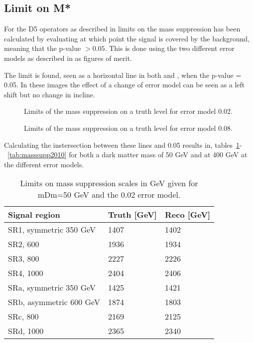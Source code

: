 \subsection{Limit on M*}\label{sec:res:subsec:m*}
For the D5 operators as described in  limits on the mass suppression has been calculated by evaluating at which point the signal is covered by the background, meaning that the p-value $>0.05$. This is done using the two different error models as described in  as figures of merit.

The limit is found, seen as a horizontal line in both  and , when the p-value = 0.05. In these images the effect of a change of error model can be seen as a left shift but no change in incline.

 \begin{figure}[H] %
    \hfill
    \caption{Limits of the mass suppression on a truth level for error model 0.02.}
    \label{fig:SRnewMt}
  \end{figure}

 \begin{figure}[H] %
    \hfill
    \caption{Limits of the mass suppression on a truth level for error model 0.08.}
    \label{fig:SRnewMr}
  \end{figure}

Calculating the instersection between these lines and 0.05 results in, tables~\ref{tab:masssupp002}-~\ref{tab:masssupp2010} for both a dark matter mass of 50 GeV and at 400 GeV at the different error models.

\begin{table}[ht]
\begin{center}
\begin{tabular}{|l|l|l|}
\hline
Signal region & Truth [GeV]& Reco [GeV]\\ \hline
SR1, symmetric 350 GeV &1407&1402\\
SR2, 600&1936&1934\\
SR3, 800&2227&2226\\
SR4, 1000&2404&2406\\ \hline
SRa, symmetric 350 GeV &1425&1421\\
SRb, asymmetric 600 GeV &1874&1803\\
SRc, 800&2169&2125\\
SRd, 1000&2365&2340\\ \hline
\end{tabular}
\caption{Limits on mass suppression scales in GeV given for mDm=50 GeV and the 0.02 error model.}
\label{tab:masssupp002}
\end{center}
\end{table}


